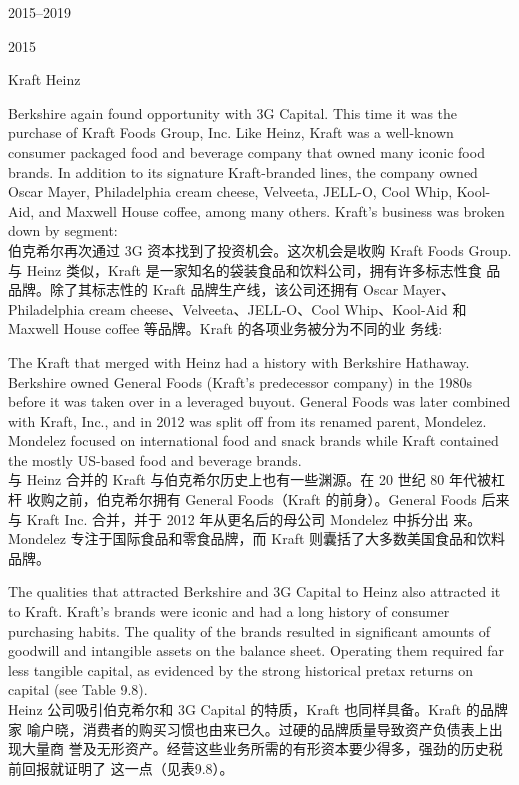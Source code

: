 \begin{chapter}{2015--2019}
\begin{section}{2015}
\begin{subsection}{Kraft Heinz}
\begin{verseparallel}
  {
    Berkshire again found opportunity with 3G Capital. This time it was the
    purchase of Kraft Foods Group, Inc. Like Heinz, Kraft was a well-known
    consumer packaged food and beverage company that owned many iconic food
    brands. In addition to its signature Kraft-branded lines, the company owned
    Oscar Mayer, Philadelphia cream cheese, Velveeta, JELL-O, Cool Whip,
    Kool-Aid, and Maxwell House coffee, among many others. Kraft's business was
    broken down by segment: \\
  }
  {
    伯克希尔再次通过 3G 资本找到了投资机会。这次机会是收购 Kraft Foods
    Group. 与 Heinz 类似，Kraft 是一家知名的袋装食品和饮料公司，拥有许多标志性食
    品品牌。除了其标志性的 Kraft 品牌生产线，该公司还拥有 Oscar
    Mayer、Philadelphia cream cheese、Velveeta、JELL-O、Cool
    Whip、Kool-Aid 和 Maxwell House coffee 等品牌。Kraft 的各项业务被分为不同的业
    务线:
  }
\end{verseparallel}

\begin{verseparallel}
  {
    The Kraft that merged with Heinz had a history with Berkshire Hathaway.
    Berkshire owned General Foods (Kraft's predecessor company) in the 1980s
    before it was taken over in a leveraged buyout. General Foods was later
    combined with Kraft, Inc., and in 2012 was split off from its renamed
    parent, Mondelez. Mondelez focused on international food and snack brands
    while Kraft contained the mostly US-based food and beverage brands. \\
  }
  {
    与 Heinz 合并的 Kraft 与伯克希尔历史上也有一些渊源。在 20 世纪 80 年代被杠杆
    收购之前，伯克希尔拥有 General Foods（Kraft 的前身）。General Foods 后来
    与 Kraft Inc. 合并，并于 2012 年从更名后的母公司 Mondelez 中拆分出
    来。Mondelez 专注于国际食品和零食品牌，而 Kraft 则囊括了大多数美国食品和饮料
    品牌。
  }
\end{verseparallel}

\begin{verseparallel}
  {
    The qualities that attracted Berkshire and 3G Capital to Heinz also
    attracted it to Kraft. Kraft's brands were iconic and had a long history of
    consumer purchasing habits. The quality of the brands resulted in
    significant amounts of goodwill and intangible assets on the balance sheet.
    Operating them required far less tangible capital, as evidenced by the
    strong historical pretax returns on capital (see Table 9.8). \\
  }
  {
    Heinz 公司吸引伯克希尔和 3G Capital 的特质，Kraft 也同样具备。Kraft 的品牌家
    喻户晓，消费者的购买习惯也由来已久。过硬的品牌质量导致资产负债表上出现大量商
    誉及无形资产。经营这些业务所需的有形资本要少得多，强劲的历史税前回报就证明了
    这一点（见表9.8）。
  }
\end{verseparallel}


\end{subsection}
\end{section}
\end{chapter}

